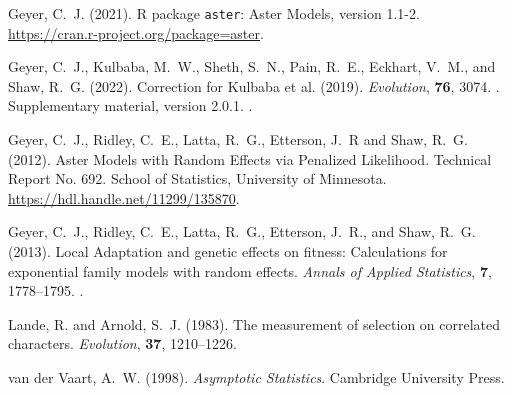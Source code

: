 \documentclass[11pt]{article}
\begin{document}
\begin{thebibliography}{}

Geyer, C.~J. (2021).
\newblock R package \texttt{aster}: Aster Models, version 1.1-2.
\newblock \url{https://cran.r-project.org/package=aster}.

Geyer, C.~J., Kulbaba, M.~W., Sheth, S.~N., Pain, R.~E., Eckhart, V.~M.,
    and Shaw, R.~G. (2022).
\newblock Correction for Kulbaba et al. (2019).
\newblock \emph{Evolution}, \textbf{76}, 3074.
\newblock {}.
\newblock Supplementary material, version 2.0.1.
\newblock {}.

Geyer, C.~J., Ridley, C.~E., Latta, R.~G., Etterson, J.~R and Shaw, R.~G.
    (2012).
\newblock Aster Models with Random Effects via Penalized Likelihood.
\newblock Technical Report No. 692.  School of Statistics,
    University of Minnesota.
\newblock \url{https://hdl.handle.net/11299/135870}.

Geyer, C.~J., Ridley, C.~E., Latta, R.~G., Etterson, J.~R., and Shaw, R.~G.
    (2013).
\newblock Local Adaptation and genetic effects on fitness: Calculations for
    exponential family models with random effects.
\newblock \emph{Annals of Applied Statistics}, \textbf{7}, 1778--1795.
\newblock {}.

Lande, R. and Arnold, S.~J. (1983).
\newblock The measurement of selection on correlated characters.
\newblock \emph{Evolution}, \textbf{37}, 1210--1226.

van der Vaart, A.~W. (1998).
\newblock \emph{Asymptotic Statistics}.
\newblock Cambridge University Press.

\end{thebibliography}
\end{document}
